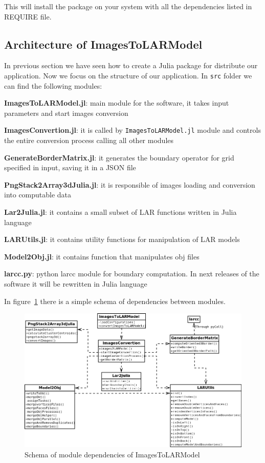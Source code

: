 \documentclass[11pt,oneside]{article}	%
\begin{document}
This will install the package on your system with all the dependencies listed in REQUIRE file. 

\subsection{Architecture of ImagesToLARModel}\label{sec:architecture}

In previous section we have seen how to create a Julia package for distribute our application. Now we focus on the structure of our application. In \texttt{src} folder we can find the following modules:

\begin{description}
 \item \textbf{ImagesToLARModel.jl}: main module for the software, it takes input parameters and start images conversion
 \item \textbf{ImagesConvertion.jl}: it is called by \texttt{ImagesToLARModel.jl} module and controls the entire conversion process calling all other modules
 \item \textbf{GenerateBorderMatrix.jl}: it generates the boundary operator for grid specified in input, saving it in a JSON file
 \item \textbf{PngStack2Array3dJulia.jl}: it is responsible of images loading and conversion into computable data
 \item \textbf{Lar2Julia.jl}: it contains a small subset of LAR functions written in Julia language
 \item \textbf{LARUtils.jl}: it contains utility functions for manipulation of LAR models
 \item \textbf{Model2Obj.jl}: it contains function that manipulates obj files
 \item \textbf{larcc.py}: python larcc module for boundary computation. In next releases of the software it will be rewritten in Julia language
\end{description}

In figure~\ref{fig:architecture} there is a simple schema of dependencies between modules.

\begin{figure}[htb]
  \begin{center}
    \includegraphics[width=16cm]{images/architecture.png}
  \end{center}
  \caption{Schema of module dependencies of ImagesToLARModel}
  \label{fig:architecture}
\end{figure}
\end{document}
